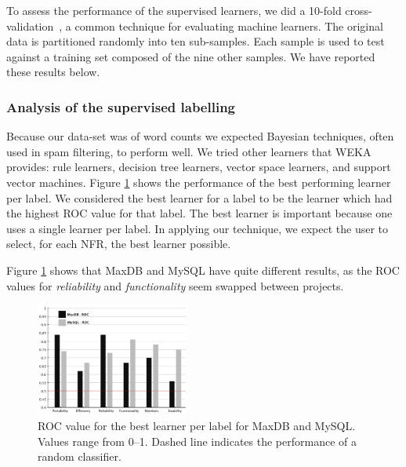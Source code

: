 \documentclass[]{sig-alternate}
\begin{document}
To assess the performance of the supervised learners, we did a 10-fold cross-validation~\cite{Kohavi1995}, a common technique for evaluating machine learners. 
The original data is partitioned randomly into ten sub-samples. Each sample is used to test against a training set composed of the nine other samples.
We have reported these results below.%

\subsubsection{Analysis of the supervised labelling}
Because our data-set was of word counts we expected Bayesian techniques, often used in spam filtering, to perform well. 
We tried other learners that WEKA~\cite{weka09} provides: rule learners, decision tree learners, vector space learners, and support vector machines.  
Figure \ref{fig:best-learn-per-tag} shows the performance of the best performing learner per label. 
 We considered the best learner for a label to be the learner which
 had the highest ROC value for that label. 
The best learner is important because one uses a single learner per label. In applying our technique, we expect the user to select, for each NFR, the best learner possible.

Figure \ref{fig:best-learn-per-tag} shows that MaxDB and MySQL have quite different results, as the ROC values for \emph{reliability} and \emph{functionality} seem swapped between projects. 

\begin{figure}
\centering
\includegraphics[width=0.45\textwidth]{figures/both-supervised}
\caption[]{ROC value for the best learner per label for MaxDB and MySQL. Values range from 0--1.  Dashed line indicates the performance of a random classifier.
}
\label{fig:best-learn-per-tag}
\end{figure}
\end{document}
